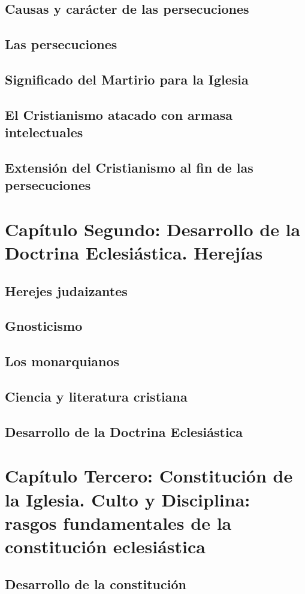 \raggedbottom{} \documentclass[12pt, a4paper]{book}
\begin{document}
\section{Causas y carácter de las persecuciones}
\section{Las persecuciones}
\section{Significado del Martirio para la Iglesia}
\section{El Cristianismo atacado con armasa intelectuales}
\section{Extensión del Cristianismo al fin de las persecuciones}
\chapter{Capítulo Segundo: Desarrollo de la Doctrina Eclesiástica. Herejías}
\section{Herejes judaizantes}
\section{Gnosticismo}
\section{Los monarquianos}
\section{Ciencia y literatura cristiana}
\section{Desarrollo de la Doctrina Eclesiástica}
\chapter{Capítulo Tercero: Constitución de la Iglesia. Culto y Disciplina: rasgos fundamentales de la constitución eclesiástica}
\section{Desarrollo de la constitución}
\end{document}
